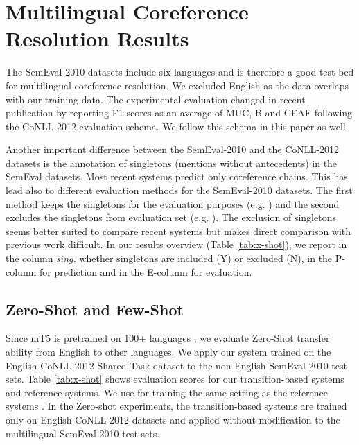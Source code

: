 \documentclass[11pt,a4paper]{article}
\begin{document}
\section{Multilingual Coreference Resolution Results}
\label{sec:multilingual}

The SemEval-2010 datasets \cite{recasens-etal-2010-semeval} include six languages and is therefore a good test bed for multilingual coreference resolution. We excluded English as the data overlaps with our training data. 
The experimental evaluation changed in recent publication by reporting F1-scores as an average of MUC, B and CEAF following the CoNLL-2012 evaluation schema. We follow this schema  in this paper as well. 

Another important difference between the SemEval-2010 and the CoNLL-2012 datasets is the annotation of singletons (mentions without antecedents) in the SemEval datasets. 
Most recent systems predict only coreference chains. This has lead also to different evaluation methods for the SemEval-2010 datasets. The first method keeps the singletons for the evaluation purposes (e.g. \cite{xia-van-durme-2021-moving}) and the second excludes the singletons from evaluation set (e.g. \cite{roesiger-kuhn-2016-ims,schroder-etal-2021-neural,bitew-etal-2021-lazy}). The exclusion of singletons seems better suited to compare recent systems but makes direct comparison with previous work difficult. In our results overview (Table \ref{tab:x-shot}), we report in the column {\em sing.} whether singletons are included (Y) or excluded (N), in the P-column for prediction and in the E-column for evaluation.  


\subsection{Zero-Shot and Few-Shot}

Since mT5 is pretrained on 100+ languages \cite{xue-etal-2021-mt5}, we evaluate Zero-Shot transfer ability from English to other languages. We apply our system trained on the English CoNLL-2012 Shared Task dataset to the non-English SemEval-2010 test sets. Table \ref{tab:x-shot} shows evaluation scores for our transition-based systems and reference systems. 
We use for training the same setting as the reference systems  \cite{kobdani-schutze-2010-sucre,roesiger-kuhn-2016-ims,schroder-etal-2021-neural}. In the Zero-shot experiments, the transition-based systems are trained only on English CoNLL-2012 datasets and applied without modification to the multilingual SemEval-2010 test sets. 
\end{document}
